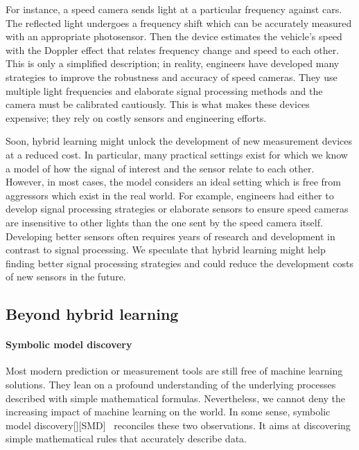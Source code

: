 For instance, a speed camera sends light at a particular frequency against cars. The reflected light undergoes a frequency shift which can be accurately measured with an appropriate photosensor. Then the device estimates the vehicle's speed with the Doppler effect that relates frequency change and speed to each other. This is only a simplified description; in reality, engineers have developed many strategies to improve the robustness and accuracy of speed cameras. They use multiple light frequencies and elaborate signal processing methods and the camera must be calibrated cautiously. This is what makes these devices expensive; they rely on costly sensors and engineering efforts.

Soon, hybrid learning might unlock the development of new measurement devices at a reduced cost. In particular, many practical settings exist for which we know a model of how the signal of interest and the sensor relate to each other. However, in most cases, the model considers an ideal setting which is free from aggressors which exist in the real world. For example, engineers had either to develop signal processing strategies or elaborate sensors to ensure speed cameras are insensitive to other lights than the one sent by the speed camera itself. Developing better sensors often requires years of research and development in contrast to signal processing. We speculate that hybrid learning might help finding better signal processing strategies and could reduce the development costs of new sensors in the future.

\subsection{Beyond hybrid learning}
\paragraph{Symbolic model discovery}
Most modern prediction or measurement tools are still free of machine learning solutions. They lean on a profound understanding of the underlying processes described with simple mathematical formulas. Nevertheless, we cannot deny the increasing impact of machine learning on the world. In some sense, symbolic model discovery[][SMD]~\citep{schmidt2009distilling,kusner2017grammar,sahoo2018learning} reconciles these two observations. It aims at discovering simple mathematical rules that accurately describe data.

